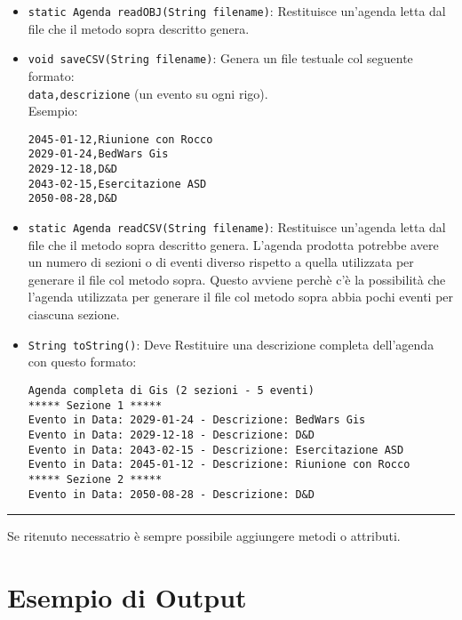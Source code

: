 \documentclass[12pt, a4paper]{article}
\begin{document}
\begin{itemize}[noitemsep, topsep=3pt]
\item \texttt{static Agenda readOBJ(String filename)}: Restituisce un'agenda letta dal file che il metodo sopra descritto genera.

\item \texttt{void saveCSV(String filename)}: Genera un file testuale col seguente formato:\\
\texttt{data,descrizione} (un evento su ogni rigo).\\
Esempio:\vspace{-.5cm}
\begin{center}
\begin{lstlisting}
2045-01-12,Riunione con Rocco
2029-01-24,BedWars Gis
2029-12-18,D&D
2043-02-15,Esercitazione ASD
2050-08-28,D&D
\end{lstlisting}
\end{center}
\vspace{-.5cm}

\item \texttt{static Agenda readCSV(String filename)}: Restituisce un'agenda letta dal file che il metodo sopra descritto genera. L'agenda prodotta potrebbe avere un numero di sezioni o di eventi diverso rispetto a quella utilizzata per generare il file col metodo sopra. Questo avviene perchè c'è la possibilità che l'agenda utilizzata per generare il file col metodo sopra abbia pochi eventi per ciascuna sezione.

\item \texttt{String toString()}: Deve Restituire una descrizione completa dell'agenda con questo formato:
\small{
\begin{lstlisting}
Agenda completa di Gis (2 sezioni - 5 eventi)
***** Sezione 1 *****
Evento in Data: 2029-01-24 - Descrizione: BedWars Gis
Evento in Data: 2029-12-18 - Descrizione: D&D
Evento in Data: 2043-02-15 - Descrizione: Esercitazione ASD
Evento in Data: 2045-01-12 - Descrizione: Riunione con Rocco
***** Sezione 2 *****
Evento in Data: 2050-08-28 - Descrizione: D&D
\end{lstlisting}}
\end{itemize}
\hrule
	Se ritenuto necessatrio è sempre possibile aggiungere metodi o attributi.
	
	\section{Esempio di Output}
\end{document}
